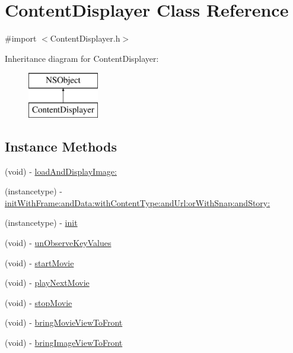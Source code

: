 \hypertarget{interface_content_displayer}{}\section{Content\+Displayer Class Reference}
\label{interface_content_displayer}


{\ttfamily \#import $<$Content\+Displayer.\+h$>$}

Inheritance diagram for Content\+Displayer\+:\begin{figure}[H]
\begin{center}
\leavevmode
\includegraphics[height=2.000000cm]{interface_content_displayer}
\end{center}
\end{figure}
\subsection*{Instance Methods}
\begin{DoxyCompactItemize}
\item 
(void) -\/ \hyperlink{interface_content_displayer_a394c0a48cc0da322443c6606bc24218e}{load\+And\+Display\+Image\+:}
\item 
(instancetype) -\/ \hyperlink{interface_content_displayer_aae262893d4c6e7ff993ff480a93186e2}{init\+With\+Frame\+:and\+Data\+:with\+Content\+Type\+:and\+Url\+:or\+With\+Snap\+:and\+Story\+:}
\item 
(instancetype) -\/ \hyperlink{interface_content_displayer_a8609eb22a891ebc39b25b6ccd4b9cb00}{init}
\item 
(void) -\/ \hyperlink{interface_content_displayer_a83192dc0784c16bd36fcd44d9483cd57}{un\+Observe\+Key\+Values}
\item 
(void) -\/ \hyperlink{interface_content_displayer_aa11e7fc5d69268a8abdb8d2c2e4dfcc6}{start\+Movie}
\item 
(void) -\/ \hyperlink{interface_content_displayer_aa820d0970ffd15f40ccf34441f8464e9}{play\+Next\+Movie}
\item 
(void) -\/ \hyperlink{interface_content_displayer_a2786869da988a49840b68827fcc113c6}{stop\+Movie}
\item 
(void) -\/ \hyperlink{interface_content_displayer_a15b41b0fc1e213541ec61ff3da5bb2c5}{bring\+Movie\+View\+To\+Front}
\item 
(void) -\/ \hyperlink{interface_content_displayer_a135fda747e1b224c270d52c0a5ca79b8}{bring\+Image\+View\+To\+Front}
\end{DoxyCompactItemize}

